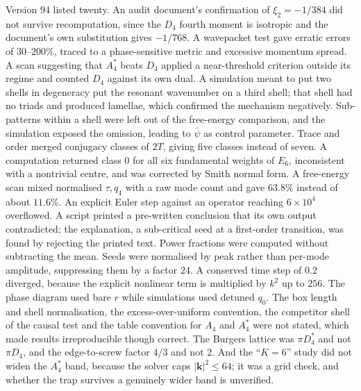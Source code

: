\documentclass[a4paper,11pt]{article}
\numberwithin{equation}{section}
\theoremstyle{jsplain}
\theoremstyle{jsrem}
\begin{document}
Version 94 listed twenty. An audit document's confirmation of $\xi_2=-1/384$ did not survive recomputation, since the $D_4$ fourth moment is isotropic and the document's own substitution gives $-1/768$. A wavepacket test gave erratic errors of $30$--$200\%$, traced to a phase-sensitive metric and excessive momentum spread. A scan suggesting that $A_4^*$ beats $D_4$ applied a near-threshold criterion outside its regime and counted $D_4$ against its own dual. A simulation meant to put two shells in degeneracy put the resonant wavenumber on a third shell; that shell had no triads and produced lamellae, which confirmed the mechanism negatively. Sub-patterns within a shell were left out of the free-energy comparison, and the simulation exposed the omission, leading to $\bar\psi$ as control parameter. Trace and order merged conjugacy classes of $2T$, giving five classes instead of seven. A computation returned class $0$ for all six fundamental weights of $E_6$, inconsistent with a nontrivial centre, and was corrected by Smith normal form. A free-energy scan mixed normalised $\tau,q_4$ with a raw mode count and gave $63.8\%$ instead of about $11.6\%$. An explicit Euler step against an operator reaching $6\times10^4$ overflowed. A script printed a pre-written conclusion that its own output contradicted; the explanation, a sub-critical seed at a first-order transition, was found by rejecting the printed text. Power fractions were computed without subtracting the mean. Seeds were normalised by peak rather than per-mode amplitude, suppressing them by a factor $24$. A conserved time step of $0.2$ diverged, because the explicit nonlinear term is multiplied by $k^2$ up to $256$. The phase diagram used bare $r$ while simulations used detuned $q_0$. The box length and shell normalisation, the excess-over-uniform convention, the competitor shell of the causal test and the table convention for $A_4$ and $A_4^*$ were not stated, which made results irreproducible though correct. The Burgers lattice was $\pi D_4^*$ and not $\pi D_4$, and the edge-to-screw factor $4/3$ and not $2$. And the ``$K=6$'' study did not widen the $A_4^*$ band, because the solver caps $|\mathbf{k}|^2\le64$; it was a grid check, and whether the trap survives a genuinely wider band is unverified.
\end{document}

